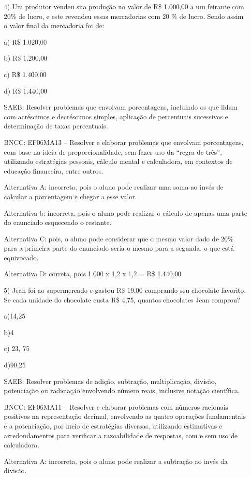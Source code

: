4) Um produtor vendeu sua produção no valor de R\$ 1.000,00 a um
feirante com 20\% de lucro, e este revendeu essas mercadorias com 20 \%
de lucro. Sendo assim o valor final da mercadoria foi de:

a) R\$ 1.020,00

b) R\$ 1.200,00

c) R\$ 1.400,00

d) R\$ 1.440,00

SAEB: Resolver problemas que envolvam porcentagens, incluindo os que
lidam com acréscimos e decréscimos simples, aplicação de percentuais
sucessivos e determinação de taxas percentuais.

BNCC: EF06MA13 -- Resolver e elaborar problemas que envolvam
porcentagens, com base na ideia de proporcionalidade, sem fazer uso da
``regra de três'', utilizando estratégias pessoais, cálculo mental e
calculadora, em contextos de educação financeira, entre outros.

Alternativa A: incorreta, pois o aluno pode realizar uma soma ao invés
de calcular a porcentagem e chegar a esse valor.

Alternativa b: incorreta, pois o aluno pode realizar o cálculo de apenas
uma parte do enunciado esquecendo o restante.

Alternativa C: pois, o aluno pode considerar que o mesmo valor dado de
20\% para a primeira parte do enunciado seria o mesmo para a segunda, o
que está equivocado.

Alternativa D: correta, pois 1.000 x 1,2 x 1,2 = R\$ 1.440,00

5) Jean foi ao supermercado e gastou R\$ 19,00 comprando seu chocolate
favorito. Se cada unidade do chocolate custa R\$ 4,75, quantos
chocolates Jean comprou?

a)14,25

b)4

c) 23, 75

d)90,25

SAEB: Resolver problemas de adição, subtração, multiplicação, divisão,
potenciação ou radiciação envolvendo número reais, inclusive notação
científica.

BNCC: EF06MA11 -- Resolver e elaborar problemas com números racionais
positivos na representação decimal, envolvendo as quatro operações
fundamentais e a potenciação, por meio de estratégias diversas,
utilizando estimativas e arredondamentos para verificar a razoabilidade
de respostas, com e sem uso de calculadora.

Alternativa A: incorreta, pois o aluno pode realizar a subtração ao
invés da divisão.

